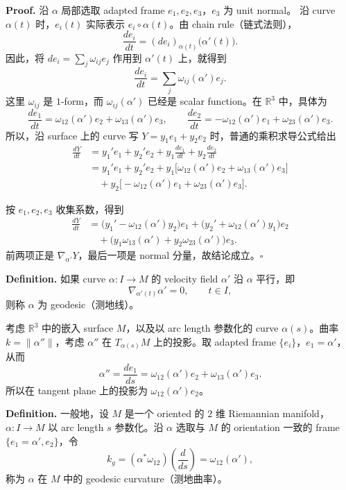\documentclass[UTF8,11pt,a4paper]{ctexart}
\begin{document}
\textbf{Proof.} 沿 $\alpha$ 局部选取 adapted frame $e_1,e_2,e_3$，$e_3$ 为 unit normal。
沿 curve $\alpha(t)$ 时，$e_i(t)$ 实际表示 $e_i\circ\alpha(t)$。由 chain rule（链式法则），
\[
\frac{de_i}{dt}
=(de_i)_{\alpha(t)}\bigl(\alpha'(t)\bigr).
\]
因此，将 $de_i=\sum_j\omega_{ij}e_j$ 作用到 $\alpha'(t)$ 上，就得到
\[
\frac{de_i}{dt}=\sum_j\omega_{ij}(\alpha')e_j.
\]
这里 $\omega_{ij}$ 是 $1$-form，而 $\omega_{ij}(\alpha')$ 已经是 scalar function。在 $\mathbb{R}^3$ 中，具体为
\[
\frac{de_1}{dt}=\omega_{12}(\alpha')e_2+\omega_{13}(\alpha')e_3,
\qquad
\frac{de_2}{dt}=-\omega_{12}(\alpha')e_1+\omega_{23}(\alpha')e_3.
\]
所以，沿 surface 上的 curve 写 $Y=y_1e_1+y_2e_2$ 时，普通的乘积求导公式给出
\begin{align*}
\frac{dY}{dt}
&=y_1'e_1+y_2'e_2+y_1\frac{de_1}{dt}+y_2\frac{de_2}{dt}\\
&=y_1'e_1+y_2'e_2
+y_1\bigl[\omega_{12}(\alpha')e_2+\omega_{13}(\alpha')e_3\bigr]\\
&\quad+y_2\bigl[-\omega_{12}(\alpha')e_1+\omega_{23}(\alpha')e_3\bigr].
\end{align*}


按 $e_1,e_2,e_3$ 收集系数，得到
\begin{align*}
\frac{dY}{dt}
&=\bigl(y_1'-\omega_{12}(\alpha')y_2\bigr)e_1
+\bigl(y_2'+\omega_{12}(\alpha')y_1\bigr)e_2\\
&\quad+\bigl(y_1\omega_{13}(\alpha')+y_2\omega_{23}(\alpha')\bigr)e_3.
\end{align*}
前两项正是 $\nabla_{\alpha'}Y$，最后一项是 normal 分量，故结论成立。\hfill$\square$

\par\noindent\textbf{Definition.} 如果 curve $\alpha\colon I\to M$ 的 velocity field $\alpha'$ 沿 $\alpha$ 平行，即
\[
\nabla_{\alpha'(t)}\alpha'=0,\qquad t\in I,
\]
则称 $\alpha$ 为 geodesic（测地线）。

\medskip
考虑 $\mathbb{R}^3$ 中的嵌入 surface $M$，以及以 arc length 参数化的 curve $\alpha(s)$。曲率 $k=\|\alpha''\|$，考虑 $\alpha''$ 在 $T_{\alpha(s)}M$ 上的投影。取 adapted frame $\{e_i\}$，$e_1=\alpha'$，从而
\[
\alpha''=\frac{de_1}{ds}
=\omega_{12}(\alpha')e_2+\omega_{13}(\alpha')e_3.
\]
所以在 tangent plane 上的投影为 $\omega_{12}(\alpha')e_2$。

\textbf{Definition.} 一般地，设 $M$ 是一个 oriented 的 $2$ 维 Riemannian manifold，$\alpha\colon I\to M$ 以 arc length $s$ 参数化。沿 $\alpha$ 选取与 $M$ 的 orientation 一致的 frame $\{e_1=\alpha',e_2\}$，令
\[
k_g=(\alpha^*\omega_{12})\left(\frac{d}{ds}\right)
=\omega_{12}(\alpha'),
\]
称为 $\alpha$ 在 $M$ 中的 geodesic curvature（测地曲率）。
\end{document}
